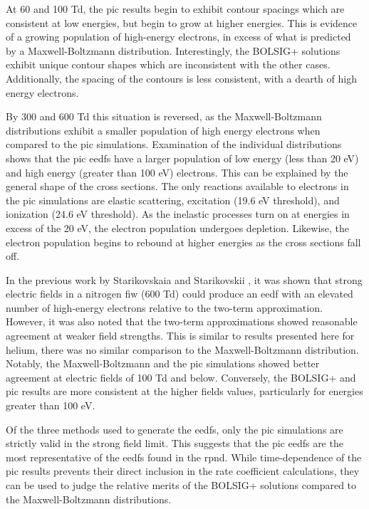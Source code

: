 At 60 and 100 Td, the \acs{pic} results begin to exhibit contour spacings which
are consistent at low energies, but begin to grow at higher energies. This is
evidence of a growing population of high-energy electrons, in excess of what is
predicted by a Maxwell-Boltzmann distribution. Interestingly, the BOLSIG+
solutions exhibit unique contour shapes which are inconsistent with the other
cases. Additionally, the spacing of the contours is less consistent, with a
dearth of high energy electrons. 

By 300 and 600 Td this situation is reversed, as the Maxwell-Boltzmann
distributions exhibit a smaller population of high energy electrons when
compared to the \acs{pic} simulations. Examination of the individual
distributions shows that the \acs{pic} \acs{eedf}s have a larger population of
low energy (less than 20 eV) and high energy (greater than 100 eV) electrons.
This can be explained by the general shape of the cross sections. The only
reactions available to electrons in the \acs{pic} simulations are elastic
scattering, excitation (19.6 eV threshold), and ionization (24.6 eV threshold).
As the inelastic processes turn on at energies in excess of the 20 eV, the
electron population undergoes depletion. Likewise, the electron population
begins to rebound at higher energies as the cross sections fall off.

In the previous work by Starikovskaia and Starikovskii \cite{Starikovskaia2001a},
it was shown that strong electric fields in a nitrogen \acs{fiw} (600 Td) could
produce an \acs{eedf} with an elevated number of high-energy electrons relative
to the two-term approximation. However, it was also noted that the two-term
approximations showed reasonable agreement at weaker field strengths. This is
similar to results presented here for helium, there was no similar comparison to
the Maxwell-Boltzmann distribution. Notably, the Maxwell-Boltzmann and the
\acs{pic} simulations showed better agreement at electric fields of 100 Td
and below. Conversely, the BOLSIG+ and \acs{pic} results are more consistent at
the higher fields values, particularly for energies greater than 100 eV.

Of the three methods used to generate the \acs{eedf}s, only the \acs{pic}
simulations are strictly valid in the strong field limit. This suggests that the
\acs{pic} \acs{eedf}s are the most representative of the \acs{eedf}s found in
the \acs{rpnd}. While time-dependence of the \acs{pic} results prevents their
direct inclusion in the rate coefficient calculations, they can be used to judge
the relative merits of the BOLSIG+ solutions compared to the Maxwell-Boltzmann
distributions.

